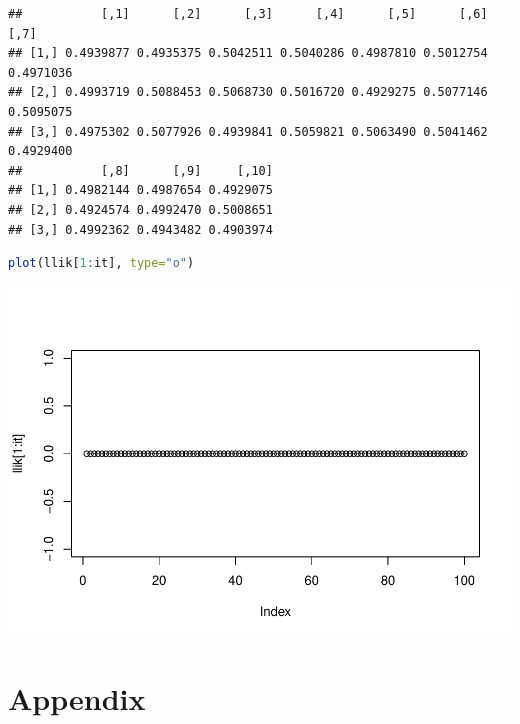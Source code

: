 \documentclass[
]{article}
\begin{document}
\begin{lstlisting}
##           [,1]      [,2]      [,3]      [,4]      [,5]      [,6]      [,7]
## [1,] 0.4939877 0.4935375 0.5042511 0.5040286 0.4987810 0.5012754 0.4971036
## [2,] 0.4993719 0.5088453 0.5068730 0.5016720 0.4929275 0.5077146 0.5095075
## [3,] 0.4975302 0.5077926 0.4939841 0.5059821 0.5063490 0.5041462 0.4929400
##           [,8]      [,9]     [,10]
## [1,] 0.4982144 0.4987654 0.4929075
## [2,] 0.4924574 0.4992470 0.5008651
## [3,] 0.4992362 0.4943482 0.4903974
\end{lstlisting}

\begin{lstlisting}[language=R]
plot(llik[1:it], type="o")
\end{lstlisting}

\includegraphics{Block2Lab1_files/figure-latex/2.1-3.pdf}

\hypertarget{appendix}{%
\section{Appendix}\label{appendix}}
\end{document}
